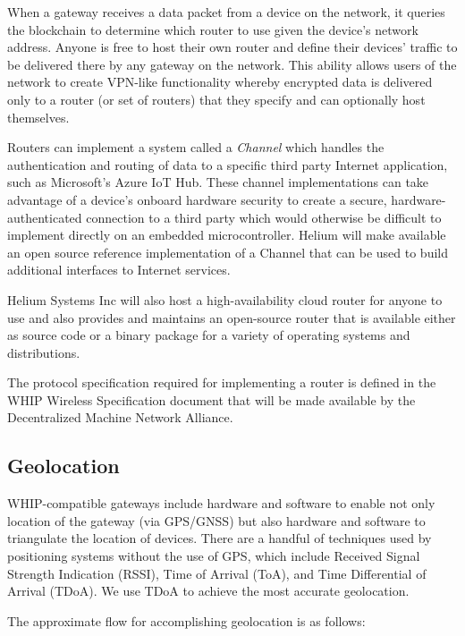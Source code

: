 \documentclass[UTF8, 10pt, nonatbib, nocopyrightspace, reprint]{sigplanconf}
\begin{document}
When a gateway receives a data packet from a device on the network, it queries the blockchain to determine which router to use given the device's network address. Anyone is free to host their own router and define their devices' traffic to be delivered there by any gateway on the network. This ability allows users of the network to create VPN-like functionality whereby encrypted data is delivered only to a router (or set of routers) that they specify and can optionally host themselves.

Routers can implement a system called a \emph{Channel} which handles the authentication and routing of data to a specific third party Internet application, such as Microsoft's Azure IoT Hub. These channel implementations can take advantage of a device's onboard hardware security to create a secure, hardware-authenticated connection to a third party which would otherwise be difficult to implement directly on an embedded microcontroller. Helium will make available an open source reference implementation of a Channel that can be used to build additional interfaces to Internet services.

Helium Systems Inc will also host a high-availability cloud router for anyone to use and also provides and maintains an open-source router that is available either as source code or a binary package for a variety of operating systems and distributions.

The protocol specification required for implementing a router is defined in the WHIP Wireless Specification document that will be made available by the Decentralized Machine Network Alliance.

\subsection{Geolocation}\label{geolocation}

WHIP-compatible gateways include hardware and software to enable not only location of the gateway (via GPS/GNSS) but also hardware and software to triangulate the location of devices. There are a handful of techniques used by positioning systems without the use of GPS, which include Received Signal Strength Indication (RSSI), Time of Arrival (ToA), and Time Differential of Arrival (TDoA). We use TDoA to achieve the most accurate geolocation.

The approximate flow for accomplishing geolocation is as follows:
\end{document}
